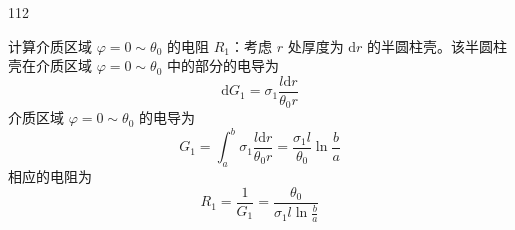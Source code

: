\begin{solution}{112}
\begin{subsolution}
        计算介质区域 $\varphi = 0\sim \theta_0$ 的电阻 $R_{1}$：考虑 $r$ 处厚度为 $\mathrm{d}r$ 的半圆柱壳。该半圆柱壳在介质区域 $\varphi = 0\sim \theta_0$ 中的部分的电导为
        \begin{equation}
            \mathrm{d} G_{1} = \sigma_{1} \frac{l \mathrm{d} r}{\theta_{0} r}
        \end{equation}
        介质区域 $\varphi = 0\sim \theta_0$ 的电导为
        \begin{equation}
            G_{1} = \int_{a}^{b} \sigma_{1} \frac{l \mathrm{d} r}{\theta_{0} r} = \frac{\sigma_{1} l}{\theta_{0}} \ln \frac{b}{a}
        \end{equation}
        相应的电阻为
        \begin{equation}
            R_{1} = \frac{1}{G_{1}} = \frac{\theta_{0}}{\sigma_{1} l \ln \frac{b}{a}}
            \label{eq:17.s112}
        \end{equation}


\end{subsolution}
\end{solution}
